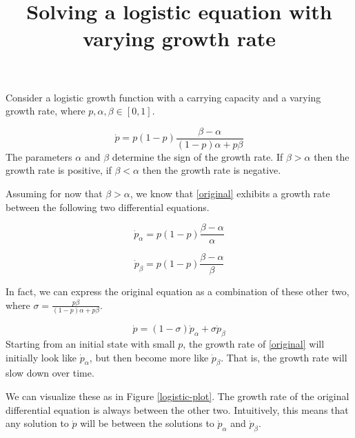 \documentclass[11pt]{article}
\begin{document}
\title{Solving a logistic equation with varying growth rate}
\date{}

\maketitle


Consider a logistic growth function with a carrying capacity and a varying growth rate, where $p, \alpha, \beta \in [0,1]$.

\begin{equation}
\dot{p} = p(1-p)\frac{\beta - \alpha}{(1-p)\alpha + p\beta}
\label{original}
\end{equation}
The parameters $\alpha$ and $\beta$ determine the sign of the growth rate. If $\beta > \alpha$ then the growth rate is positive, if $\beta < \alpha$ then the growth rate is negative.

Assuming for now that $\beta > \alpha$, we know that \eqref{original} exhibits a growth rate between the following two differential equations.

\begin{equation}
\dot{p}_\alpha = p(1-p)\frac{\beta - \alpha}{\alpha}
\end{equation}

\begin{equation}
\dot{p}_\beta = p(1-p)\frac{\beta - \alpha}{\beta}
\end{equation}

In fact, we can express the original equation as a combination of these other two, where $\sigma = \frac{p\beta}{(1-p)\alpha + p \beta}$.

\begin{equation}
\dot{p} = (1-\sigma)\dot{p}_{\alpha} + \sigma\dot{p}_{\beta}
\end{equation}
Starting from an initial state with small $p$, the growth rate of \eqref{original} will initially look like $\dot{p}_\alpha$, but then become more like $\dot{p}_\beta$. That is, the growth rate will slow down over time.

We can visualize these as in Figure \ref{logistic-plot}. The growth rate of the original differential equation is always between the other two. Intuitively, this means that any solution to $\dot{p}$ will be between the solutions to $\dot{p}_\alpha$ and $\dot{p}_\beta$. 

%
\end{document}
